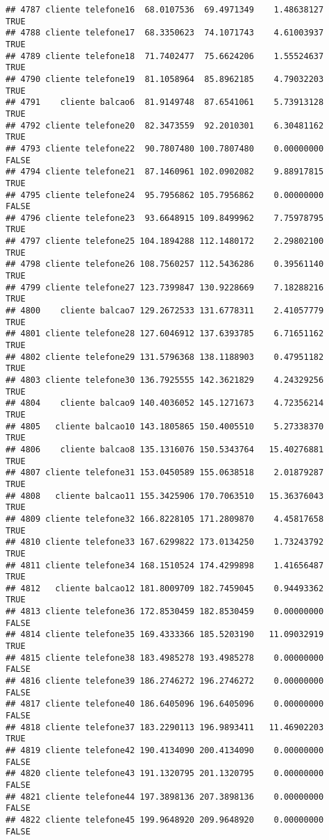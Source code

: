 \documentclass[
]{article}
\begin{document}
\begin{verbatim}
## 4787 cliente telefone16  68.0107536  69.4971349    1.48638127     TRUE
## 4788 cliente telefone17  68.3350623  74.1071743    4.61003937     TRUE
## 4789 cliente telefone18  71.7402477  75.6624206    1.55524637     TRUE
## 4790 cliente telefone19  81.1058964  85.8962185    4.79032203     TRUE
## 4791    cliente balcao6  81.9149748  87.6541061    5.73913128     TRUE
## 4792 cliente telefone20  82.3473559  92.2010301    6.30481162     TRUE
## 4793 cliente telefone22  90.7807480 100.7807480    0.00000000    FALSE
## 4794 cliente telefone21  87.1460961 102.0902082    9.88917815     TRUE
## 4795 cliente telefone24  95.7956862 105.7956862    0.00000000    FALSE
## 4796 cliente telefone23  93.6648915 109.8499962    7.75978795     TRUE
## 4797 cliente telefone25 104.1894288 112.1480172    2.29802100     TRUE
## 4798 cliente telefone26 108.7560257 112.5436286    0.39561140     TRUE
## 4799 cliente telefone27 123.7399847 130.9228669    7.18288216     TRUE
## 4800    cliente balcao7 129.2672533 131.6778311    2.41057779     TRUE
## 4801 cliente telefone28 127.6046912 137.6393785    6.71651162     TRUE
## 4802 cliente telefone29 131.5796368 138.1188903    0.47951182     TRUE
## 4803 cliente telefone30 136.7925555 142.3621829    4.24329256     TRUE
## 4804    cliente balcao9 140.4036052 145.1271673    4.72356214     TRUE
## 4805   cliente balcao10 143.1805865 150.4005510    5.27338370     TRUE
## 4806    cliente balcao8 135.1316076 150.5343764   15.40276881     TRUE
## 4807 cliente telefone31 153.0450589 155.0638518    2.01879287     TRUE
## 4808   cliente balcao11 155.3425906 170.7063510   15.36376043     TRUE
## 4809 cliente telefone32 166.8228105 171.2809870    4.45817658     TRUE
## 4810 cliente telefone33 167.6299822 173.0134250    1.73243792     TRUE
## 4811 cliente telefone34 168.1510524 174.4299898    1.41656487     TRUE
## 4812   cliente balcao12 181.8009709 182.7459045    0.94493362     TRUE
## 4813 cliente telefone36 172.8530459 182.8530459    0.00000000    FALSE
## 4814 cliente telefone35 169.4333366 185.5203190   11.09032919     TRUE
## 4815 cliente telefone38 183.4985278 193.4985278    0.00000000    FALSE
## 4816 cliente telefone39 186.2746272 196.2746272    0.00000000    FALSE
## 4817 cliente telefone40 186.6405096 196.6405096    0.00000000    FALSE
## 4818 cliente telefone37 183.2290113 196.9893411   11.46902203     TRUE
## 4819 cliente telefone42 190.4134090 200.4134090    0.00000000    FALSE
## 4820 cliente telefone43 191.1320795 201.1320795    0.00000000    FALSE
## 4821 cliente telefone44 197.3898136 207.3898136    0.00000000    FALSE
## 4822 cliente telefone45 199.9648920 209.9648920    0.00000000    FALSE

\end{verbatim}
\end{document}

